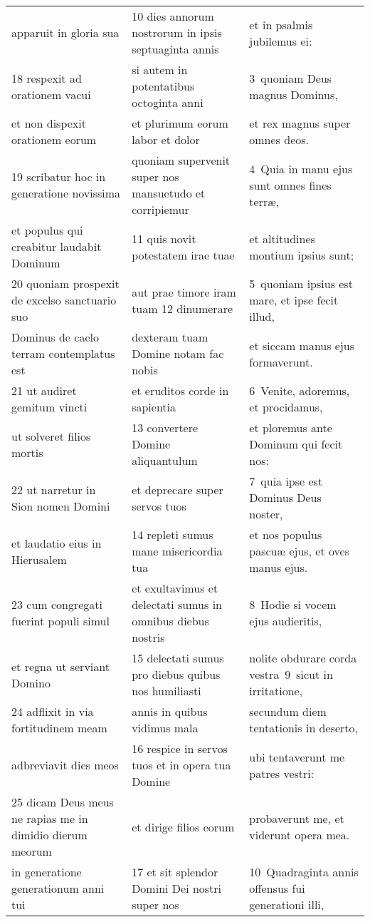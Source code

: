 \documentclass{article}
\begin{document}
\begin{longtable}{@{}p{}p{}p{}@{}}
apparuit in gloria sua	&	10 dies annorum nostrorum in ipsis septuaginta annis	&	et in psalmis jubilemus ei:	\\
18 respexit ad orationem vacui	&	si autem in potentatibus octoginta anni	&	3 quoniam Deus magnus Dominus,	\\
et non dispexit orationem eorum	&	et plurimum eorum labor et dolor	&	et rex magnus super omnes deos.	\\
19 scribatur hoc in generatione novissima	&	quoniam supervenit super nos mansuetudo et corripiemur	&	4 Quia in manu ejus sunt omnes fines terræ,	\\
et populus qui creabitur laudabit Dominum	&	11 quis novit potestatem irae tuae	&	et altitudines montium ipsius sunt;	\\
20 quoniam prospexit de excelso sanctuario suo	&	aut prae timore iram tuam 12 dinumerare	&	5 quoniam ipsius est mare, et ipse fecit illud,	\\
Dominus de caelo terram contemplatus est	&	dexteram tuam Domine notam fac nobis	&	et siccam manus ejus formaverunt.	\\
21 ut audiret gemitum vincti	&	et eruditos corde in sapientia	&	6 Venite, adoremus, et procidamus,	\\
ut solveret filios mortis	&	13 convertere Domine aliquantulum	&	et ploremus ante Dominum qui fecit nos:	\\
22 ut narretur in Sion nomen Domini	&	et deprecare super servos tuos	&	7 quia ipse est Dominus Deus noster,	\\
et laudatio eius in Hierusalem	&	14 repleti sumus mane misericordia tua	&	et nos populus pascuæ ejus, et oves manus ejus.	\\
23 cum congregati fuerint populi simul	&	et exultavimus et delectati sumus in omnibus diebus nostris	&	8 Hodie si vocem ejus audieritis,	\\
et regna ut serviant Domino	&	15 delectati sumus pro diebus quibus nos humiliasti	&	nolite obdurare corda vestra 9 sicut in irritatione,	\\
24 adflixit in via fortitudinem meam	&	annis in quibus vidimus mala	&	secundum diem tentationis in deserto,	\\
adbreviavit dies meos	&	16 respice in servos tuos et in opera tua Domine	&	ubi tentaverunt me patres vestri:	\\
25 dicam Deus meus ne rapias me in dimidio dierum meorum	&	et dirige filios eorum	&	probaverunt me, et viderunt opera mea.	\\
in generatione generationum anni tui	&	17 et sit splendor Domini Dei nostri super nos	&	10 Quadraginta annis offensus fui generationi illi,	\\

\end{longtable}
\end{document}
